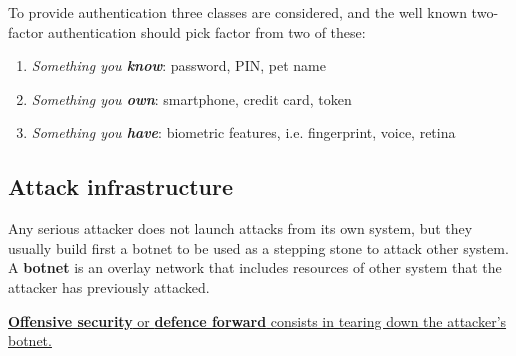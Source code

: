 To provide authentication three classes are considered, and the well known two-factor authentication should pick factor from two of these:
\begin{enumerate}
    \item \textit{Something you \textbf{know}}: password, PIN, pet name
    \item \textit{Something you \textbf{own}}: smartphone, credit card, token
    \item \textit{Something you \textbf{have}}: biometric features, i.e. fingerprint, voice, retina
\end{enumerate}

\subsection{Attack infrastructure}
Any serious attacker does not launch attacks from its own
system, but they usually build first a botnet to be used as a stepping
stone to attack other system.
A \textbf{botnet} is an overlay network that includes resources of other
system that the attacker has previously attacked.

\ul{\textbf{Offensive security} or \textbf{defence forward} consists in tearing down the attacker's botnet.}
